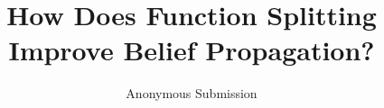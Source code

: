 \documentclass[letterpaper]{article} %
\title{How Does Function Splitting Improve Belief Propagation?}
\author{
    Anonymous Submission
}
\theoremstyle{definition}
\theoremstyle{remark}
\begin{document}
\maketitle












\def\isChecklistMainFile{}

\end{document}
